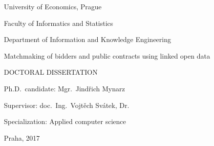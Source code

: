 \begin{titlepage}
    \begin{center}
        \begingroup 
        \sffamily

        \large
        University of Economics, Prague
        
        \small
        Faculty of Informatics and Statistics
        
        Department of Information and Knowledge Engineering

        \vfill

        \LARGE
        Matchmaking of bidders and public contracts using linked open data
        
        \normalsize
        \uppercase{Doctoral dissertation}

        \vspace{4cm}
       
        \small
        Ph.D.~candidate: Mgr.~Jindřich Mynarz

        Supervisor: doc.~Ing.~Vojtěch Svátek, Dr.

        Specialization: Applied computer science

        \vfill
        
        Praha, 2017

        \endgroup
    \end{center}
\end{titlepage}
